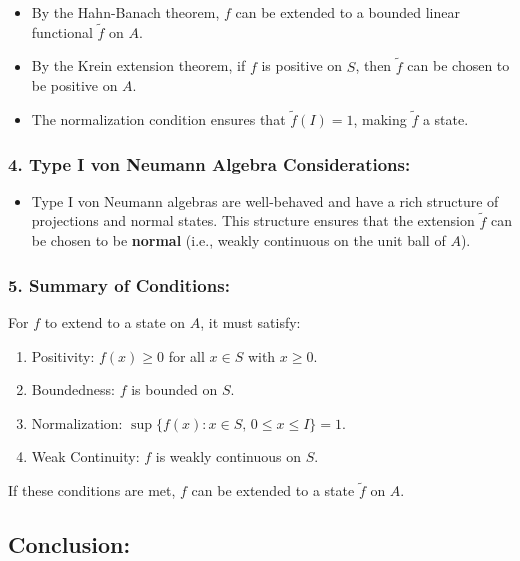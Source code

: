 \documentclass{article}
\begin{document}
\begin{itemize}
\item By the Hahn-Banach theorem, $f $ can be extended to a bounded linear
functional $\tilde{f} $ on $A $. 

\item By the Krein extension theorem, if $f $ is positive on $S $, then $%
\tilde{f} $ can be chosen to be positive on $A $. 

\item The normalization condition ensures that $\tilde{f}(I) = 1 $, making $%
\tilde{f} $ a state.
\end{itemize}

\subsubsection*{4. \textbf{Type I von Neumann Algebra Considerations}:}

\begin{itemize}
\item Type I von Neumann algebras are well-behaved and have a rich structure
of projections and normal states. This structure ensures that the extension $%
\tilde{f} $ can be chosen to be \textbf{normal} (i.e., weakly continuous on
the unit ball of $A $).
\end{itemize}

\subsubsection*{5. \textbf{Summary of Conditions}:}

For $f $ to extend to a state on $A $, it must satisfy:

\begin{enumerate}
\item Positivity: $f(x) \geq 0 $ for all $x \in S $ with $x \geq 0 $. 

\item Boundedness: $f $ is bounded on $S $. 

\item Normalization: $\sup \{ f(x) : x \in S, \, 0 \leq x \leq I \} = 1 $. 

\item Weak Continuity: $f $ is weakly continuous on $S $.
\end{enumerate}

If these conditions are met, $f $ can be extended to a state $\tilde{f} $ on 
$A $.

\subsection*{Conclusion:}
\end{document}
